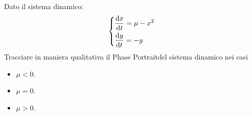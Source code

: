\begin{ex}[]
    Dato il sistema dinamico:
    \[
    \begin{dcases}
    \frac{\text{d} x}{\text{d} t} = \mu-x^2\\
    \frac{\text{d} y}{\text{d} t} = -y
    \end{dcases}
    \]
    Tracciare in maniera qualitativa il Phase Portraitdel sistema dinamico nei casi
    \begin{itemize}
        \item $\mu <0$.
	\item $\mu =0$.
	\item $\mu >0$.
    \end{itemize}
\end{ex}
\noindent
